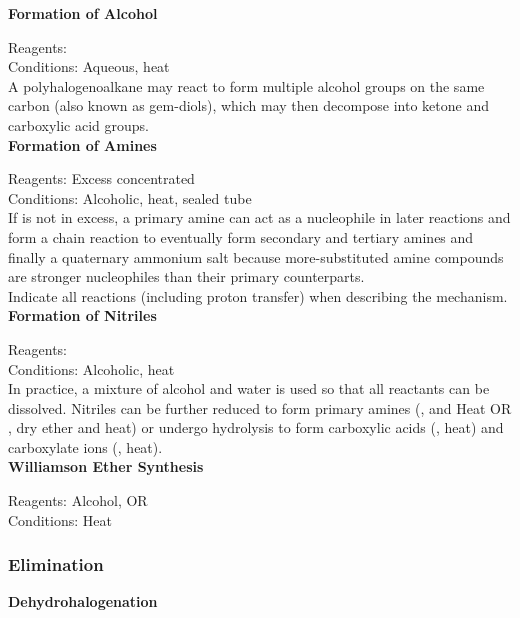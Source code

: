 \documentclass[../main]{subfiles}
\begin{document}
	\noindent \textbf{Formation of Alcohol}

	Reagents:  \\
	Conditions: Aqueous, heat \\

	A polyhalogenoalkane may react to form multiple alcohol groups on the same carbon (also known as gem-diols), which may then decompose into ketone and carboxylic acid groups. \\

	\noindent \textbf{Formation of Amines}

	Reagents: Excess concentrated  \\
	Conditions: Alcoholic, heat, sealed tube \\

	If  is not in excess, a primary amine can act as a nucleophile in later reactions and form a chain reaction to eventually form secondary and tertiary amines and finally a quaternary ammonium salt because more-substituted amine compounds are stronger nucleophiles than their primary counterparts. \\

	Indicate all reactions (including proton transfer) when describing the mechanism. \\

	\noindent \textbf{Formation of Nitriles}

	Reagents:  \\
	Conditions: Alcoholic, heat \\

	In practice, a mixture of alcohol and water is used so that all reactants can be dissolved. Nitriles can be further reduced to form primary amines (,  and Heat OR , dry ether and heat) or undergo hydrolysis to form carboxylic acids (, heat) and carboxylate ions (, heat). \\

	\noindent \textbf{Williamson Ether Synthesis}

	Reagents: Alcohol,  OR \\
	Conditions: Heat \\

	\subsubsection{Elimination}

	\noindent \textbf{Dehydrohalogenation}
\end{document}
